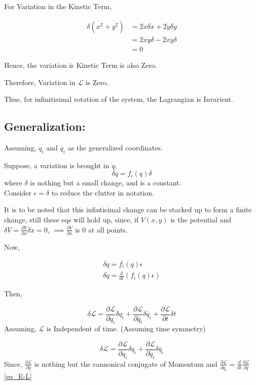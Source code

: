 \documentclass[a4paper]{article}
\newcommand{\Lagr}{\mathcal{L}}
\newcommand{\ddt}{\frac{d}{dt}}
\newcommand{\pdt}[2]{\frac{\partial #1}{\partial #2}}
\begin{document}
			For Variation in the Kinetic Term,

			\begin{equation}
				\begin{split}	
					\delta (\dot{x^2} + \dot{y^2}) & = 2 \dot{x} \delta \dot{x} + 2 \dot{y} \delta \dot{y} \\
					& = 2 \dot{x} \dot{y} \delta - 2 \dot{x} \dot{y} \delta \\
					& = 0
				\end{split}
			\end{equation}
			
			Hence, the variation is Kinetic Term is also Zero.

			Therefore, Variation in $\Lagr$ is Zero.

			Thus, for infinitisimal rotation of the system, the Lagrangian is Invarient.
			
		\subsection*{Generalization: }

			\noindent

			Assuming, $q_i$ and $\dot{q_i}$ as the generalized coordinates.

			Suppose, a variation is brought in $q$,
			$$ \delta q = f_i(q) \delta $$ where $\delta$ is nothing but a small change, and is a constant. \hfill \\
			Consider $\epsilon = \delta$ to reduce the clutter in notation.

			It is to be noted that this infintisimal change can be stacked up to form a finite change, still these eqs will hold up, since, if $V(x, y)$ is the potential and $\delta V = \pdt{V}{x}\delta x = 0$, $\implies \pdt{V}{x}$ is $0$ at all points.

			Now,

			\begin{eqnarray}
				\delta q = f_i(q) \epsilon \label{eq_q} \\
				\delta \dot{q} = \ddt(f_i(q) \epsilon) \label{eq_dotq}
			\end{eqnarray}
			
			Then,

			$$ \delta \Lagr = \pdt{\Lagr}{q_i}\delta q_i + \pdt{\Lagr}{\dot{q_i}}\delta \dot{q_i} + \pdt{\Lagr}{t} \delta t $$
			Assuming, $\Lagr$ is Independent of time. (Assuming time symmetry)

			$$ \delta \Lagr = \pdt{\Lagr}{q_i}\delta q_i + \pdt{\Lagr}{\dot{q_i}}\delta \dot{q_i} $$
			Since, $\pdt{\Lagr}{\dot{q}}$ is nothing but the cannonical conjugate of Momentum and $\pdt{\Lagr}{q_i}=\ddt \pdt{\Lagr}{\dot{q}}$\eqref{eq_E-L}
\end{document}
